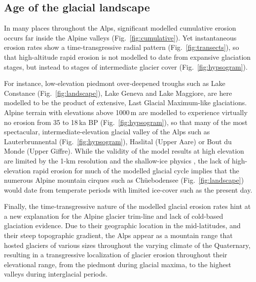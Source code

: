\documentclass[utf8]{article}
\newcommand{\aref}[0]{\textcolor{darkblue}{\textbf{[REF.]}}}
\begin{document}
\subsection{Age of the glacial landscape}

    In many places throughout the Alps, significant modelled cumulative erosion
    occurs far inside the Alpine valleys (Fig.~\ref{fig:cumulative}). Yet
    instantaneous erosion rates show a time-transgressive radial pattern
    (Fig.~\ref{fig:transects}), so that high-altitude rapid erosion is not
    modelled to date from expansive glaciation stages, but instead to stages of
    intermediate glacier cover (Fig.~\ref{fig:hypsogram}).

    For instance, low-elevation piedmont over-deepened troughs such as Lake
    Constance (Fig.~\ref{fig:landscape}), Lake Geneva and Lake Maggiore, are
    here modelled to be the product of extensive, Last Glacial Maximum-like
    glaciations. Alpine terrain with elevations above 1000\,m are modelled to
    experience virtually no erosion from 35 to 18\,ka BP
    (Fig.~\ref{fig:hypsogram}), so that many of the most spectacular,
    intermediate-elevation glacial valley of the Alps such as Lauterbrunnental
    (Fig.~\ref{fig:hypsogram}), Haslital (Upper Aare) or Bout du Monde (Upper
    Giffre). While the validity of the model results at high elevation are
    limited by the 1-km resolution and the shallow-ice physics
    \citep{Imhof.etal.2019}, the lack of high-elevation rapid erosion for much
    of the modelled glacial cycle implies that the numerous Alpine mountain
    cirques such as Ch\"uebodensee (Fig.~\ref{fig:landscape}) would date from
    temperate periods with limited ice-cover such as the present day.

    Finally, the time-transgressive nature of the modelled glacial erosion
    rates hint at a new explanation for the Alpine glacier trim-line and lack
    of cold-based glaciation evidence. Due to their geographic location in the
    mid-latitudes, and their steep topographic gradient, the Alps appear as a
    mountain range that hosted glaciers of various sizes throughout the varying
    climate of the Quaternary, resulting in a transgressive localization of
    glacier erosion throughout their elevational range, from the piedmont
    during glacial maxima, to the highest valleys during interglacial periods.
\end{document}
